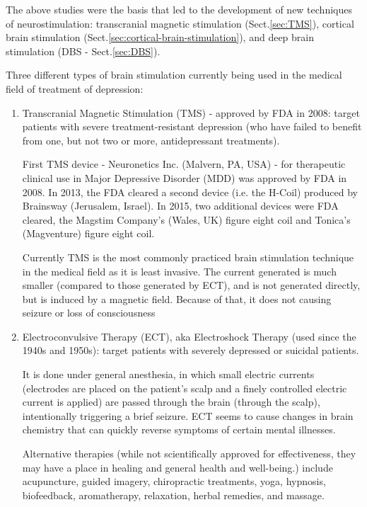 The above studies were the basis that led to the development of new techniques
of neurostimulation: transcranial magnetic stimulation (Sect.\ref{sec:TMS}),
cortical brain stimulation (Sect.\ref{sec:cortical-brain-stimulation}), and deep
brain stimulation (DBS - Sect.\ref{sec:DBS}).


Three different types of brain stimulation currently being used in the medical
field of treatment of depression: 

\begin{enumerate}

  \item Transcranial Magnetic Stimulation (TMS) - approved by FDA in 2008:
  target patients with severe treatment-resistant depression (who have failed to
  benefit from one, but not two or more, antidepressant treatments).
  
  First TMS device -  Neuronetics Inc. (Malvern, PA, USA) - for therapeutic
  clinical use in Major Depressive Disorder (MDD) was approved by FDA in 2008.
  In 2013, the FDA cleared a second device (i.e. the H-Coil) produced by
  Brainsway (Jerusalem, Israel). In 2015, two additional devices were FDA
  cleared, the Magstim Company's (Wales, UK) figure eight coil and Tonica's
  (Magventure) figure eight coil.  
  
  Currently TMS is the most commonly practiced brain stimulation technique in
  the medical field as it is least invasive. The current generated is much
  smaller (compared to those generated by ECT), and is not generated directly,
  but is induced by a magnetic field. Because of that, it does not 
  causing seizure or loss of consciousness
  
  \item Electroconvulsive Therapy (ECT), aka Electroshock Therapy (used since
  the 1940s and 1950s):  target patients with severely depressed or suicidal patients. 
  
  It is done under general anesthesia, in which small electric currents
  (electrodes are placed on the patient's scalp and a finely controlled electric
  current is applied) are passed through the brain (through the scalp),
  intentionally triggering a brief seizure. ECT seems to cause changes in brain
  chemistry that can quickly reverse symptoms of certain mental illnesses.
  
  Alternative therapies (while not scientifically approved for effectiveness,
  they may have a place in healing and general health and well-being.) include
  acupuncture, guided imagery, chiropractic treatments, yoga, hypnosis,
  biofeedback, aromatherapy, relaxation, herbal remedies, and massage.
  

\end{enumerate}

